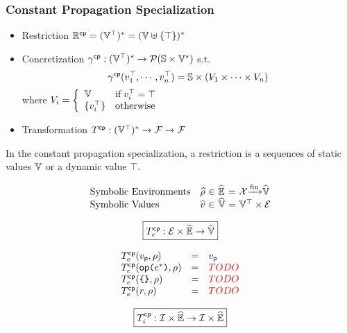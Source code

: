 \todo



\subsubsection{Constant Propagation Specialization}
\begin{itemize}
  \item Restriction $\mathbb{R}^{\textsf{cp}} = (\mathbb{V}^\top)^* =
    (\mathbb{V} \uplus \{ \top \})^*$
  \item Concretization $\gamma^{\textsf{cp}}: (\mathbb{V}^\top)^* \rightarrow \mathcal{P}(\mathbb{S}
    \times \mathbb{V}^*)$ s.t.
    \[
      \gamma^{\textsf{cp}}(v^\top_1, \cdots, v^\top_n) = \mathbb{S} \times (V_1 \times \cdots
      \times V_n)
    \]
    where $V_i = \left\{
      \begin{array}{ll}
        \mathbb{V} & \text{if} \; v^\top_i = \top\\
        \{ v^\top_i \} & \text{otherwise}\\
      \end{array}
    \right.$
  \item Transformation $T^{\textsf{cp}}: (\mathbb{V}^\top)^* \rightarrow \mathcal{F}
    \rightarrow \mathcal{F}$
\end{itemize}
In the constant propagation specialization, a restriction is a sequences of
static values $\mathbb{V}$ or a dynamic value $\top$.

\[
  \begin{array}{lr@{~}c@{~}l@{~}c@{~}l}
    \text{Symbolic Environments} & \senv &\in& \senvset &=&
    \varset \finmap \svalset\\
    \text{Symbolic Values} & \sval &\in& \svalset &=&
    \valoptset \times \exprset\\
  \end{array}
\]

\[
  \framebox{$\cptransforme: \exprset \times \senvset \rightarrow \svalset$}
\]

\[
  \begin{array}{lcl}
    T^{\textsf{cp}}_e(v_{\textsf{p}}, \rho) &=& v_{\textsf{p}}\\
    T^{\textsf{cp}}_e(\textsf{op} \texttt{(} e^* \texttt{)}, \rho) &=& {\color{red}{TODO}}\\
    T^{\textsf{cp}}_e(\texttt{\{} \texttt{\}}, \rho) &=& {\color{red}{TODO}}\\
    T^{\textsf{cp}}_e(r, \rho) &=& {\color{red}{TODO}}\\
  \end{array}
\]

\[
  \framebox{$\cptransformi: \instset \times \senvset \rightarrow \instset \times
  \senvset$}
\]


